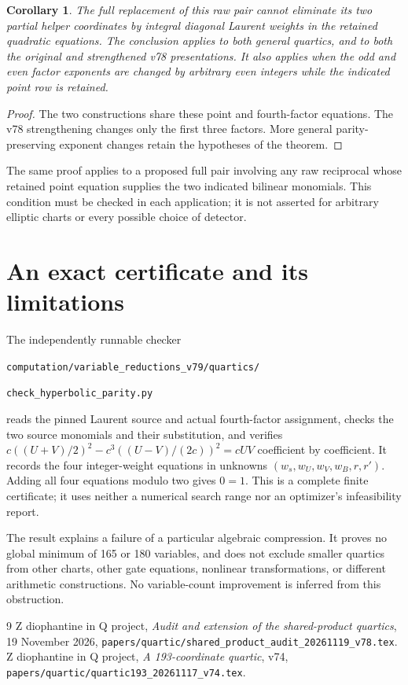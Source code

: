 \documentclass[11pt]{article}
\newtheorem{corollary}[theorem]{Corollary}
\begin{document}
\begin{corollary}
The full replacement of this raw pair cannot eliminate its two partial
helper coordinates by integral diagonal Laurent weights in the retained
quadratic equations. The conclusion applies to both general quartics,
and to both the original and strengthened v78 presentations. It also
applies when the odd and even factor exponents are changed by arbitrary
even integers while the indicated point row is retained.
\end{corollary}
\begin{proof}
The two constructions share these point and fourth-factor equations.
The v78 strengthening changes only the first three factors. More general
parity-preserving exponent changes retain the hypotheses of the theorem.
\end{proof}

The same proof applies to a proposed full pair involving any raw
reciprocal whose retained point equation supplies the two indicated
bilinear monomials. This condition must be checked in each application;
it is not asserted for arbitrary elliptic charts or every possible
choice of detector.

\section{An exact certificate and its limitations}
The independently runnable checker
\begin{center}\small
\nolinkurl{computation/variable_reductions_v79/quartics/}\par
\nolinkurl{check_hyperbolic_parity.py}
\end{center}
reads the pinned Laurent source and actual fourth-factor assignment,
checks the two source monomials and their substitution, and verifies
$c((U+V)/2)^2-c^3((U-V)/(2c))^2=cUV$ coefficient by coefficient.
It records the four integer-weight equations in unknowns
$(w_s,w_U,w_V,w_B,r,r')$. Adding all four equations modulo two gives
$0=1$. This is a complete finite certificate; it uses neither a numerical
search range nor an optimizer's infeasibility report.

The result explains a failure of a particular algebraic compression.
It proves no global minimum of 165 or 180 variables, and does not
exclude smaller quartics from other charts, other gate equations,
nonlinear transformations, or different arithmetic constructions.
No variable-count improvement is inferred from this obstruction.

\begin{thebibliography}{9}
 Z diophantine in Q project, \emph{Audit and extension of the
shared-product quartics}, 19 November 2026,
\nolinkurl{papers/quartic/shared_product_audit_20261119_v78.tex}.
 Z diophantine in Q project, \emph{A 193-coordinate quartic},
v74, \nolinkurl{papers/quartic/quartic193_20261117_v74.tex}.
\end{thebibliography}
\end{document}

